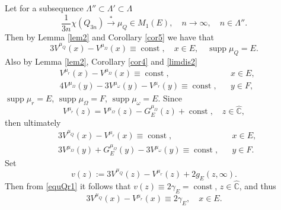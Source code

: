 \documentclass[11pt, a4paper, twoside]{article}
\let\myh\widehat
\def\CC{\mathbb C}
\def\supp{\operatorname{supp}}
\def\const{\operatorname{const}}
\theoremstyle{plain}
\theoremstyle{definition}
\begin{document}
Let for a subsequence  $\Lambda''\subset\Lambda'\subset\Lambda$
\begin{equation}
\frac1{3n}\chi(Q_{3n}){\overset{*}\longrightarrow}\mu_Q\in M_1(E), \quad n\to\infty, \quad n\in\Lambda''.
\label{limdisQ}
\end{equation}
Then by Lemma \ref{lem2} and Corollary \ref{cor5} we have that
\begin{equation}
3V^{\mu_Q}(x)-V^{\mu_\Omega}(x)\equiv\const,
\quad x\in E,\quad\supp{\mu_Q}=E.
\label{relequQOm}
\end{equation}
Also by Lemma \ref{lem2}, Corollary \ref{cor4} and \eqref{limdis2}
\begin{align*}
&V^{\mu_r}(x)-V^{\mu_\Omega}(x)\equiv\const, && x \in E, \\
&4V^{\mu_\Omega}(y)-3V^{\mu_\omega}(y)-V^{\mu_r}(y)\equiv\const, && y\in F,
\end{align*}
$\supp{\mu_r}=E$, $\supp{\mu_\Omega}= F$, $\supp{\mu_\omega}= E$. Since
$$V^{\mu_r}(z)=V^{\mu_\Omega}(z)-G_E^{\mu_\Omega}(z)+\const, \quad z\in\myh{\CC}, $$
then ultimately
\begin{align}
&3V^{\mu_Q}(x)-V^{\mu_r}(x)\equiv\const, && x\in E,\label{equQr1}\\
&3V^{\mu_\Omega}(y)+G_E^{\mu_\Omega}(y)-3V^{\mu_\omega}(y)\equiv\const, && y\in F.\label{equOmom1}
\end{align}
Set
$$
v(z):=3V^{\mu_Q}(z)-V^{\mu_r}(z)+2g_E(z,\infty).
$$
Then from \eqref{equQr1} it follows that $v(z)\equiv2\gamma_E=\const$, $z\in\myh{\CC}$, and thus
\begin{equation}
3V^{\mu_Q}(x)-V^{\mu_r}(x)\equiv2\gamma_E,\quad x\in E.
\label{equQr2}
\end{equation}
\end{document}
